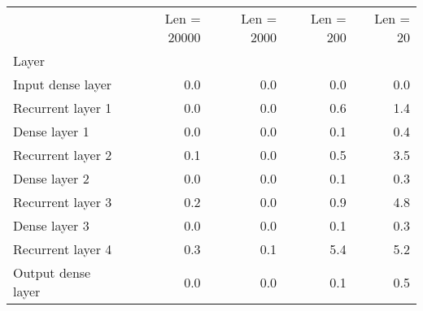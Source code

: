 \begin{tabular}{lrrrr}
\toprule
{} &  Len  = 20000 &  Len  = 2000 &  Len  = 200 &  Len  = 20 \\
Layer              &               &              &             &            \\
\midrule
Input dense layer  &           0.0 &          0.0 &         0.0 &        0.0 \\
Recurrent layer 1  &           0.0 &          0.0 &         0.6 &        1.4 \\
Dense layer 1      &           0.0 &          0.0 &         0.1 &        0.4 \\
Recurrent layer 2  &           0.1 &          0.0 &         0.5 &        3.5 \\
Dense layer 2      &           0.0 &          0.0 &         0.1 &        0.3 \\
Recurrent layer 3  &           0.2 &          0.0 &         0.9 &        4.8 \\
Dense layer 3      &           0.0 &          0.0 &         0.1 &        0.3 \\
Recurrent layer 4  &           0.3 &          0.1 &         5.4 &        5.2 \\
Output dense layer &           0.0 &          0.0 &         0.1 &        0.5 \\
\bottomrule
\end{tabular}
